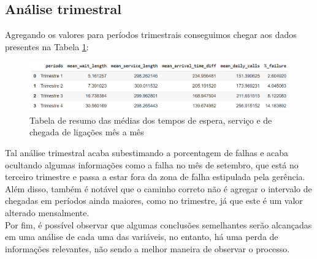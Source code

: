 \subsection{Análise trimestral}
Agregando os valores para períodos trimestrais conseguimos chegar aos dados presentes na Tabela \ref*{fig: tritab_img}:

\begin{figure}[H]
    \includegraphics[scale=0.7]{analise-de-dados/trimestral/tritab.png}
    \caption{Tabela de resumo das médias dos tempos de espera, serviço e de chegada de ligações mês a mês}
    \label{fig: tritab_img}
\end{figure}

Tal análise trimestral acaba subestimando a porcentagem de falhas e acaba ocultando algumas informações como a falha no mês de setembro, que está no terceiro trimestre e passa a estar fora da zona de falha estipulada pela gerência.\\
Além disso, também é notável que o caminho correto não é agregar o intervalo de chegadas em períodos ainda maiores, como no trimestre, já que este é um valor alterado mensalmente.\\
Por fim, é possível observar que algumas conclusões semelhantes serão alcançadas em uma análise de cada uma das variáveis, no entanto, há uma perda de informações relevantes, não sendo a melhor maneira de observar o processo.\\